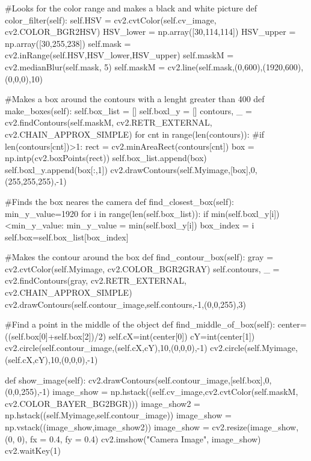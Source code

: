     

   #Looks for the color range and makes a black and white picture 
    def color_filter(self):  
        self.HSV = cv2.cvtColor(self.cv_image, cv2.COLOR_BGR2HSV)
        HSV_lower = np.array([30,114,114])
        HSV_upper = np.array([30,255,238])
        self.mask = cv2.inRange(self.HSV,HSV_lower,HSV_upper)
        self.maskM = cv2.medianBlur(self.mask, 5)
        self.maskM = cv2.line(self.mask,(0,600),(1920,600),(0,0,0),10)

    
    #Makes a box around the contours with a lenght greater than 400
    def make_boxes(self):
        self.box_list = []
        self.boxl_y = []
        contours, _ = cv2.findContours(self.maskM, cv2.RETR_EXTERNAL, cv2.CHAIN_APPROX_SIMPLE)
        for cnt in range(len(contours)):
            #if len(contours[cnt])>1:
                rect = cv2.minAreaRect(contours[cnt])
                box = np.intp(cv2.boxPoints(rect))
                self.box_list.append(box)
                self.boxl_y.append(box[:,1])
                cv2.drawContours(self.Myimage,[box],0,(255,255,255),-1)

#Finds the box neares the camera 
    def find_closest_box(self):
        min_y_value=1920
        for i in range(len(self.box_list)):
            if min(self.boxl_y[i])<min_y_value: 
                min_y_value = min(self.boxl_y[i])
                box_index = i 
        self.box=self.box_list[box_index]

#Makes the contour around the box
    def find_contour_box(self):
        gray = cv2.cvtColor(self.Myimage, cv2.COLOR_BGR2GRAY)
        self.contours, _ = cv2.findContours(gray, cv2.RETR_EXTERNAL, cv2.CHAIN_APPROX_SIMPLE)
        cv2.drawContours(self.contour_image,self.contours,-1,(0,0,255),3)

#Find a point in the middle of the object
    def find_middle_of_box(self):    
        center=((self.box[0]+self.box[2])/2)
        self.cX=int(center[0])
        cY=int(center[1])
        cv2.circle(self.contour_image,(self.cX,cY),10,(0,0,0),-1)
        cv2.circle(self.Myimage,(self.cX,cY),10,(0,0,0),-1)


    def show_image(self):
        cv2.drawContours(self.contour_image,[self.box],0,(0,0,255),-1)
        image_show = np.hstack((self.cv_image,cv2.cvtColor(self.maskM, cv2.COLOR_BAYER_BG2BGR)))
        image_show2 = np.hstack((self.Myimage,self.contour_image))
        image_show = np.vstack((image_show,image_show2))
        image_show = cv2.resize(image_show, (0, 0), fx = 0.4, fy = 0.4)
        cv2.imshow("Camera Image", image_show)
        cv2.waitKey(1)


